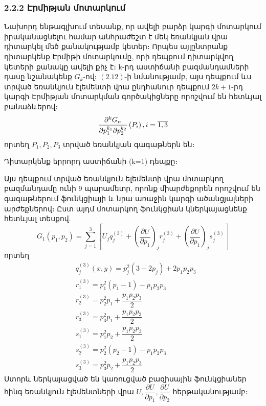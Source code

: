 \documentclass[fleqn, bachelor,subf,12pt,notitlepage]{article}
\begin{document}
\subsubsection*{{2.2.2 Էրմիթյան մոտարկում}}
Նախորդ ենթագլխում տեսանք, որ ավելի բարձր կարգի մոտարկում իրականացնելու համար անհրաժեշտ է մեկ եռանկյան վրա դիտարկել մեծ քանակությամբ կետեր։ Որպես այլընտրանք դիտարկենք Էրմիթի մոտարկումը, որի դեպքում դիտարկվող կետերի քանակը ավելի քիչ է։ k-րդ աստիճանի բազմանդամների դասը նշանակենք $G_{k}$-ով։ $\left(2.12\right)$-ի նմանությամբ, այս դեպքում ևս տրված եռանկյուն էլեմենտի վրա ընդհանուր դեպքում $2k+1$-րդ կարգի Էրմիթյան մոտարկման գործակիցները որոշվում են հետևյալ բանաձևերով։
\begin{equation}
\dfrac{\partial^{k} G_{n}}{\partial p_{1}^{k_{1}} \partial p_{2}^{k_{2}}}\left(P_{i}\right), i = \overline{1, 3}\\
\end{equation}
որտեղ $P_{1}, P_{2}, P_{3}$ տրված եռանկյան գագաթներն են։

Դիտարկենք երրորդ աստիճանի (k=1) դեպքը։

Այս դեպքում տրված եռանկյուն ելեմենտի վրա մոտարկող բազմանդամը ունի 9 պարամետր, որոնք միարժեքորեն որոշվում են գագաթներում ֆունկցիայի և նրա առաջին կարգի ածանցյալների արժեքներով։ Ըստ այդմ մոտարկող ֆունկցիան կներկայացնենք հետևյալ տեսքով.
\begin{equation}
				G_{1}\left(p_{1},p_{2}\right)=\sum_{j=1}^{3}\left[U_{j}q^{(3)}_{j}+\left(\dfrac{\partial U}{\partial p_{1}}\right)_{j}r^{(3)}_{j}+\left(\dfrac{\partial U}{\partial p_{1}}\right)_{j}s^{(3)}_{j}\right]
\end{equation}
որտեղ
\begin{equation}
\begin{aligned}
&q_{j}^{(3)}\left(x,y\right)=p_{j}^{2}\left(3 - 2p_{j}\right) + 2p_{1}p_{2}p_{3} \\
&r^{(3)}_{1} = p_{1}^{2}\left(p_{1} - 1\right) - p_{1}p_{2}p_{3} \\
&r^{(3)}_{2} = p_{2}^{2}p_{1} + \dfrac{p_{1}p_{2}p_{3}}{2} \\
&r^{(3)}_{3} = p_{3}^{2}p_{1} + \dfrac{p_{1}p_{2}p_{3}}{2}\\
&s^{(3)}_{1} = p_{1}^{2}p_{2}+\dfrac{p_{1}p_{2}p_{3}}{2}\\
&s^{(3)}_{2} = p_{2}^{2}\left(p_{2}-1\right) -p_{1}p_{2}p_{3}\\
&s^{(3)}_{3} = p_{3}^{2}p_{2}+\dfrac{p_{1}p_{2}p_{3}}{2}
\end{aligned}
\end{equation}
Ստորև ներկայացված են կառուցված բազիսային ֆունկցիաներ հինգ եռանկյուն էլեմենտների վրա $U, \dfrac{\partial U}{\partial p_{1}}, \dfrac{\partial U}{\partial p_{2}}$ հերթականությամբ։
\end{document}
